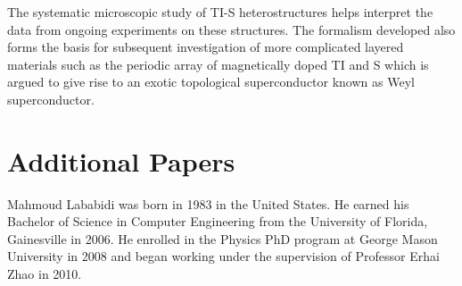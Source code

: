 \documentclass[11pt,letterpaper]{report}
\begin{document}
The systematic microscopic study of TI-S heterostructures helps interpret the data from ongoing experiments on these structures. The formalism developed also forms the basis for subsequent investigation of more complicated layered materials such as the periodic array of magnetically doped TI and S which is argued to give rise to an exotic topological superconductor known as Weyl superconductor.

\thispagestyle{empty}



\startofchapters






\appendix
\vspace{0in}
\chapter{Additional Papers}
\pagestyle{empty}






{}

\cvpage

\noindent Mahmoud Lababidi was born in 1983 in the United States. He earned his Bachelor of Science in Computer Engineering from the University of Florida, Gainesville in 2006. He enrolled in the Physics PhD program at George Mason University in 2008 and began working under the supervision of Professor Erhai Zhao in 2010. 
\end{document}
